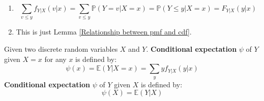 \documentclass{huhtakm-template-book}
\newcommand{\prob}{\mathbb{P}}
\newcommand{\expect}{\mathbb{E}}
\begin{document}
    \begin{proofing}
        \begin{enumerate}
            \item 
            \begin{equation*}
                \sum_{v\leq y}f_{Y|X}(v|x)=\sum_{v\leq y}\prob(Y=v|X=x)=\prob(Y\leq y|X=x)=F_{Y|X}(y|x)
            \end{equation*}
            \item 
            This is just Lemma \ref{Relationship between pmf and cdf}.
        \end{enumerate}
    \end{proofing}

    \newpage
    \begin{defn}
        Given two discrete random variables $X$ and $Y$. \textbf{Conditional expectation} $\psi$ of $Y$ given $X=x$ for any $x$ is defined by:
        \begin{equation*}
            \psi(x)=\expect(Y|X=x)=\sum_{y}yf_{Y|X}(y|x)
        \end{equation*}
        \textbf{Conditional expectation} $\psi$ of $Y$ given $X$ is defined by:
        \begin{equation*}
            \psi(X)=\expect(Y|X)
        \end{equation*}
    \end{defn}
\end{document}
